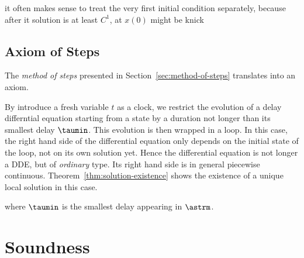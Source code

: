 it often makes sense to treat the very first initial condition separately, because after it solution is at least $C^1$, at $x(0)$ might be knick

    \subsection{Axiom of Steps}
        \label{sec:axiom-of-steps}

        The \emph{method of steps} presented in Section~\ref{sec:method-of-steps} translates into an axiom.

        By introduce a fresh variable $t$ as a clock, we restrict the evolution of a delay differntial equation starting from a state by a duration not longer than its smallest delay $\taumin$. This evolution is then wrapped in a loop.
        In this case, the right hand side of the differential equation only depends on the initial state of the loop, not on its own solution yet. Hence the differential equation is not longer a DDE, but of \emph{ordinary} type.
        Its right hand side is in general piecewise continuous.
        Theorem~\ref{thm:solution-existence} shows the existence of a unique local solution in this case.

        \begin{calculus}
        \end{calculus}

        where $\taumin$ is the smallest delay appearing in $\astrm$.



\section{Soundness}
    \label{sec:soundness}

